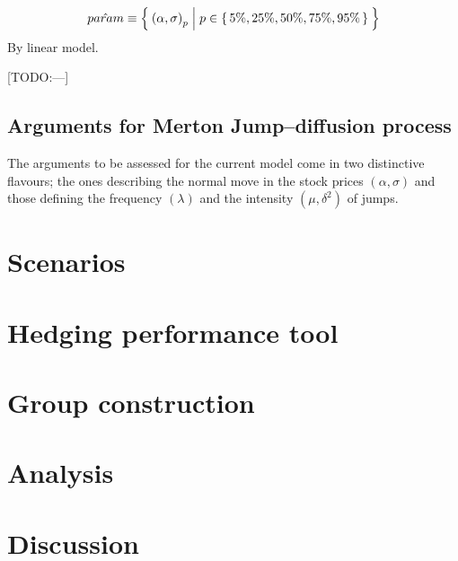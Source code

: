 \documentclass[12pt]{report}
\begin{document}
\begin{align}
\hat{param} \equiv \Set{\left(\alpha, \sigma\right)_p | p \in \set{5\%, 25\%, 50\%, 75\%, 95\%}}
\end{align}
By linear model.


[TODO:---]

\subsection{Arguments for Merton Jump--diffusion process}
\label{sub:methodology:market:merton}

The arguments to be assessed for the current model come in two distinctive flavours; the ones describing the normal move in the stock prices $(\alpha, \sigma)$ and those defining the frequency $(\lambda)$ and the intensity $(\mu, \delta^2)$ of jumps.




\section{Scenarios}
\label{sec:methodology:scenarios}



\section{Hedging performance tool}
\label{sec:methodology:hedging}


\section{Group construction}
\label{sec:methodology:group}


\section{Analysis}
\label{sec:methodology:analysis}


\section{Discussion}
\label{sec:methodology:discussion}














\end{document}
